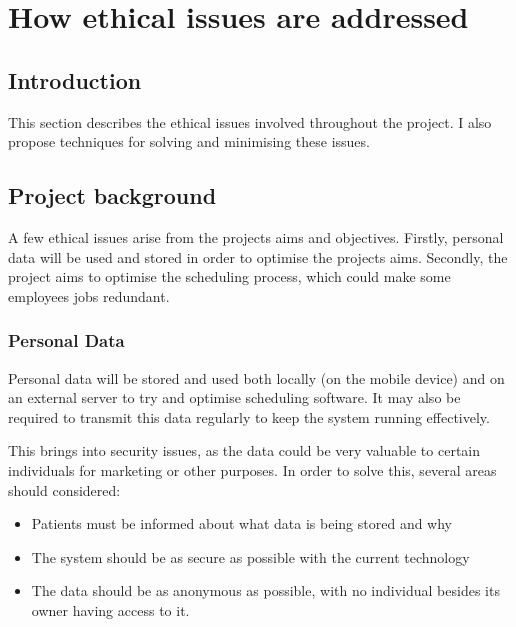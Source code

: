 
\chapter{How ethical issues are addressed} %

\label{AppendixC} %


\section{Introduction}

This section describes the ethical issues involved throughout the project. I also propose techniques for solving and minimising these issues.

\section{Project background}

A few ethical issues arise from the projects aims and objectives. Firstly, personal data will be used and stored in order to optimise the projects aims. Secondly, the project aims to optimise the scheduling process, which could make some employees jobs redundant.

\subsection{Personal Data}

Personal data will be stored and used both locally (on the mobile device) and on an external server to try and optimise scheduling software. It may also be required to transmit this data regularly to keep the system running effectively.

This brings into security issues, as the data could be very valuable to certain individuals for marketing or other purposes. In order to solve this, several areas should considered:

\begin{itemize}
	\item Patients must be informed about what data is being stored and why
	\item The system should be as secure as possible with the current technology
	\item The data should be as anonymous as possible, with no individual besides its owner having access to it.
\end{itemize}

